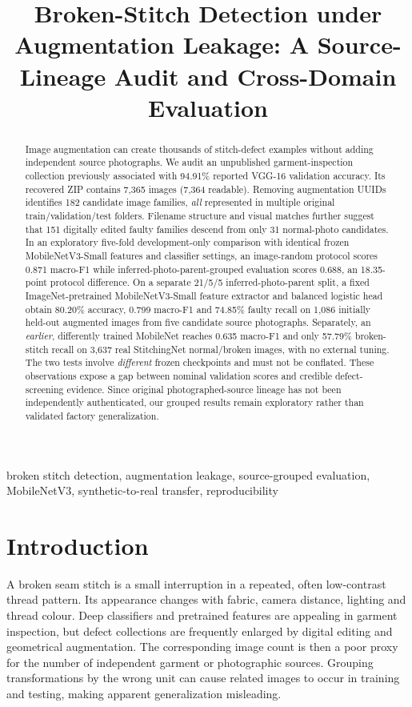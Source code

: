 \documentclass[conference,a4paper]{IEEEtran}
\begin{document}
\title{Broken-Stitch Detection under Augmentation Leakage: A Source-Lineage Audit and Cross-Domain Evaluation}
\author{} %
\maketitle
\begin{abstract}
Image augmentation can create thousands of stitch-defect examples without adding independent source photographs. We audit an unpublished garment-inspection collection previously associated with 94.91\% reported VGG-16 validation accuracy. Its recovered ZIP contains 7,365 images (7,364 readable). Removing augmentation UUIDs identifies 182 candidate image families, \emph{all} represented in multiple original train/validation/test folders. Filename structure and visual matches further suggest that 151 digitally edited faulty families descend from only 31 normal-photo candidates. In an exploratory five-fold development-only comparison with identical frozen MobileNetV3-Small features and classifier settings, an image-random protocol scores 0.871 macro-F1 while inferred-photo-parent-grouped evaluation scores 0.688, an 18.35-point protocol difference. On a separate 21/5/5 inferred-photo-parent split, a fixed ImageNet-pretrained MobileNetV3-Small feature extractor and balanced logistic head obtain 80.20\% accuracy, 0.799 macro-F1 and 74.85\% faulty recall on 1,086 initially held-out augmented images from five candidate source photographs. Separately, an \emph{earlier}, differently trained MobileNet reaches 0.635 macro-F1 and only 57.79\% broken-stitch recall on 3,637 real StitchingNet normal/broken images, with no external tuning. The two tests involve \emph{different} frozen checkpoints and must not be conflated. These observations expose a gap between nominal validation scores and credible defect-screening evidence. Since original photographed-source lineage has not been independently authenticated, our grouped results remain exploratory rather than validated factory generalization.
\end{abstract}
\begin{IEEEkeywords}
broken stitch detection, augmentation leakage, source-grouped evaluation, MobileNetV3, synthetic-to-real transfer, reproducibility
\end{IEEEkeywords}

\section{Introduction}
A broken seam stitch is a small interruption in a repeated, often low-contrast thread pattern. Its appearance changes with fabric, camera distance, lighting and thread colour. Deep classifiers and pretrained features are appealing in garment inspection, but defect collections are frequently enlarged by digital editing and geometrical augmentation. The corresponding image count is then a poor proxy for the number of independent garment or photographic sources. Grouping transformations by the wrong unit can cause related images to occur in training and testing, making apparent generalization misleading.
\end{document}
